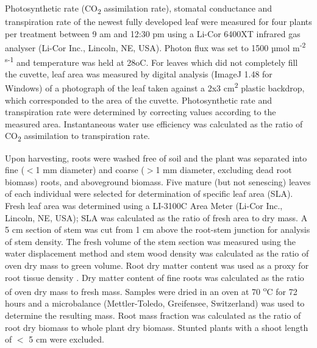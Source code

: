 \documentclass[12pt,a4paper]{memoir}
\begin{document}
Photosynthetic rate (CO\textsubscript{2} assimilation rate), stomatal conductance and transpiration rate of the newest fully developed leaf were measured for four plants per treatment between 9 am and 12:30 pm using a Li-Cor 6400XT infrared gas analyser (Li-Cor Inc., Lincoln, NE, USA). Photon flux was set to 1500 µmol m\textsuperscript{-2 s-1} and temperature was held at 28oC. For leaves which did not completely fill the cuvette, leaf area was measured by digital analysis (ImageJ 1.48 for Windows) of a photograph of the leaf taken against a 2x3 cm\textsuperscript{2} plastic backdrop, which corresponded to the area of the cuvette. Photosynthetic rate and transpiration rate were determined by correcting values according to the measured area. Instantaneous water use efficiency was calculated as the ratio of CO\textsubscript{2} assimilation to transpiration rate.

Upon harvesting, roots were washed free of soil and the plant was separated into fine ($<$1 mm diameter) and coarse ($>$1 mm diameter, excluding dead root biomass) roots, and aboveground biomass. Five mature (but not senescing) leaves of each individual were selected for determination of specific leaf area (SLA). Fresh leaf area was determined using a LI-3100C Area Meter (Li-Cor Inc., Lincoln, NE, USA); SLA was calculated as the ratio of fresh area to dry mass.  A 5 cm section of stem was cut from 1 cm above the root-stem junction for analysis of stem density. The fresh volume of the stem section was measured using the water displacement method and stem wood density was calculated as the ratio of oven dry mass to green volume. Root dry matter content was used as a proxy for root tissue density \citep{Birouste2013}. Dry matter content of fine roots was calculated as the ratio of oven dry mass to fresh mass. Samples were dried in an oven at 70 \textsuperscript{o}C for 72 hours and a microbalance (Mettler-Toledo, Greifensee, Switzerland) was used to determine the resulting mass. Root mass fraction was calculated as the ratio of root dry biomass to whole plant dry biomass. Stunted plants with a shoot length of $<$ 5 cm were excluded.
\end{document}
